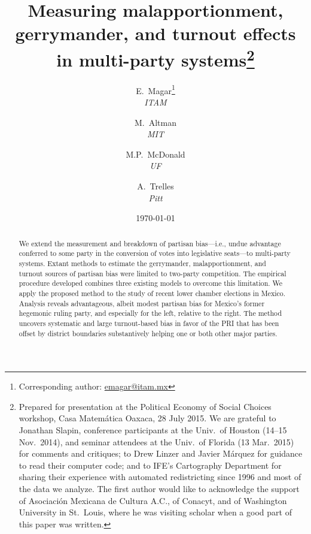 \documentclass[letter,12pt]{article}
\begin{document}
\title{Measuring malapportionment, gerrymander, and turnout effects in multi-party systems\thanks{Prepared for presentation at the Political Economy of Social Choices workshop, Casa Matem\'atica Oaxaca, 28 July 2015. We are grateful to Jonathan Slapin, conference participants at the Univ.\ of Houston (14--15 Nov.\ 2014), and seminar attendees at the Univ.\ of Florida (13 Mar.\ 2015) for comments and critiques; to Drew Linzer and Javier M\'arquez for guidance to read their computer code; and to IFE's Cartography Department for sharing their experience with automated redistricting since 1996 and most of the data we analyze. The first author would like to acknowledge the support of Asociaci\'on Mexicana de Cultura A.C., of Conacyt, and of Washington University in St.\ Louis, where he was visiting scholar when a good part of this paper was written.}}
\author{E.~Magar\footnote{Corresponding author: \url{emagar@itam.mx}} \\ \emph{ITAM} \and
        M.~Altman \\ \emph{MIT} \and
        M.P.~McDonald \\ \emph{UF} \and  
        A.~Trelles \\ \emph{Pitt}
      }
\date{\today}
\maketitle





\begin{abstract}
\noindent We extend the measurement and breakdown of partisan bias---i.e., undue advantage conferred to some party in the conversion of votes into legislative seats---to multi-party systems. Extant methods to estimate the gerrymander, malapportionment, and turnout sources of partisan bias were limited to two-party competition. The empirical procedure developed combines three existing models to overcome this limitation. We apply the proposed method to the study of recent lower chamber elections in Mexico. Analysis reveals advantageous, albeit modest partisan bias for Mexico's former hegemonic ruling party, and especially for the left, relative to the right. The method uncovers systematic and large turnout-based bias in favor of the PRI that has been offset by district boundaries substantively helping one or both other major parties.
\end{abstract}
\end{document}
